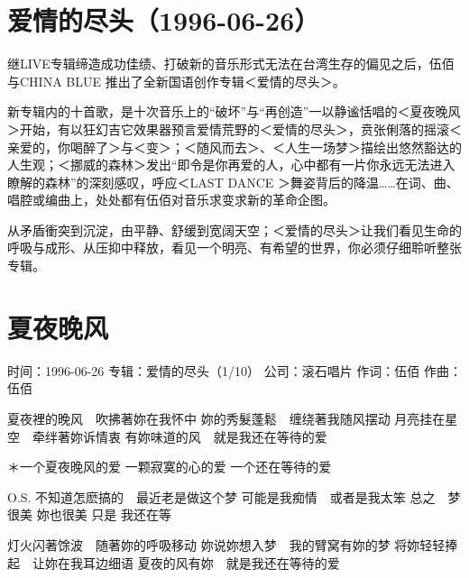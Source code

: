 \documentclass[UTF8,a4paper,oneside,twocolumn,12pt]{ctexbook}
\newcommand{\infopair}[2]{\textbullet #1：#2}
\newcommand{\zc}[1][伍佰]{\infopair{作词}{#1}}
\newcommand{\zq}[1][伍佰]{\infopair{作曲}{#1}}
\newcommand{\zj}[1]{\infopair{专辑}{#1}}
\newcommand{\sj}[1]{\infopair{时间}{#1}}
\newcommand{\gs}[1]{\infopair{公司}{#1}}
\newenvironment{info}{\begin{flushleft}\kaishu
	}
	{\end{flushleft}\normalsize\yahei\par}
\newenvironment{lyric}{
	}
{}
\begin{document}
\section*{爱情的尽头（1996-06-26）}
继LIVE专辑缔造成功佳绩、打破新的音乐形式无法在台湾生存的偏见之后，伍佰与CHINA BLUE 推出了全新国语创作专辑＜爱情的尽头＞。

新专辑内的十首歌，是十次音乐上的“破坏”与“再创造”一以静谧恬唱的＜夏夜晚风＞开始，有以狂幻吉它效果器预言爱情荒野的＜爱情的尽头＞，贲张俐落的摇滚＜亲爱的，你喝醉了＞与＜变＞；＜随风而去＞、＜人生一场梦＞描绘出悠然豁达的人生观；＜挪威的森林＞发出“即令是你再爱的人，心中都有一片你永远无法进入瞭解的森林”的深刻感叹，呼应＜LAST DANCE ＞舞姿背后的降温……在词、曲、唱腔或编曲上，处处都有伍佰对音乐求变求新的革命企图。

从矛盾衝突到沉淀，由平静、舒缓到宽阔天空；＜爱情的尽头＞让我们看见生命的呼吸与成形、从压抑中释放，看见一个明亮、有希望的世界，你必须仔细聆听整张专辑。

\section{夏夜晚风}
\begin{info}
	\sj{1996-06-26}
	\zj{爱情的尽头（1/10）}
	\gs{滚石唱片}
	\zc
	\zq
\end{info}
\begin{lyric}
	夏夜裡的晚风　吹拂著妳在我怀中
	妳的秀髮蓬鬆　缠绕著我随风摆动
	月亮挂在星空　牵绊著妳诉情衷
	有妳味道的风　就是我还在等待的爱

	＊一个夏夜晚风的爱
	一颗寂寞的心的爱
	一个还在等待的爱

	O.S. 不知道怎麽搞的　最近老是做这个梦
	可能是我痴情　或者是我太笨
	总之　梦很美
	妳也很美
	只是
	我还在等

	灯火闪著馀波　随著妳的呼吸移动
	妳说妳想入梦　我的臂窝有妳的梦
	将妳轻轻捧起　让妳在我耳边细语
	夏夜的风有妳　就是我还在等待的爱
\end{lyric}
\end{document}
